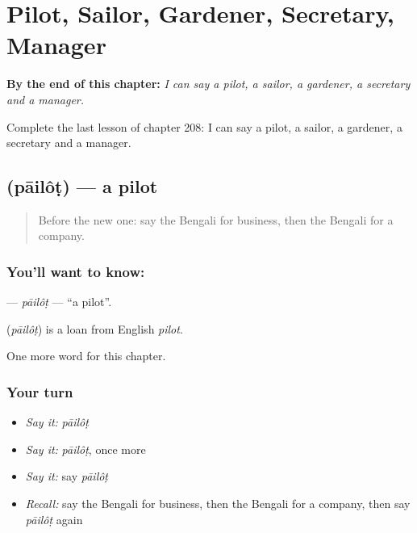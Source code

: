 
\chapter{Pilot, Sailor, Gardener, Secretary, Manager}
\label{ch:bn-pilot-sailor-gardener-secretary-manager}

\begin{chapteropening}
\textbf{By the end of this chapter:} \emph{I can say a pilot, a sailor, a gardener, a secretary and a manager.}

Complete the last lesson of chapter 208: I can say a pilot, a sailor, a gardener, a secretary and a manager.
\end{chapteropening}

\section[\texorpdfstring{\bn{পাইলট} (pāilôṭ)}{পাইলট (pāilôṭ)}]{ (pāilôṭ) — a pilot}

\label{lesson:BN-C208-pailot}



\begin{quote}
Before the new one: say the Bengali for business, then the Bengali for a company.
\end{quote}

\subsection*{You'll want to know: }
\textbf{} — \emph{pāilôṭ} — \textquotedblleft{}a pilot\textquotedblright{}.

\begin{cousinweb}
\textbf{} (\emph{pāilôṭ}) is a loan from English \emph{pilot}.
\end{cousinweb}

\begin{grammarlens}[title={What you've built}]
One more word for this chapter.
\end{grammarlens}

\subsection*{Your turn}
\begin{itemize}
\raggedright
  \item \emph{Say it:} \emph{pāilôṭ}
  \item \emph{Say it:} \emph{pāilôṭ}, once more
  \item \emph{Say it:} say \emph{pāilôṭ}
  \item \emph{Recall:} say the Bengali for business, then the Bengali for a company, then say \emph{pāilôṭ} again
\end{itemize}

